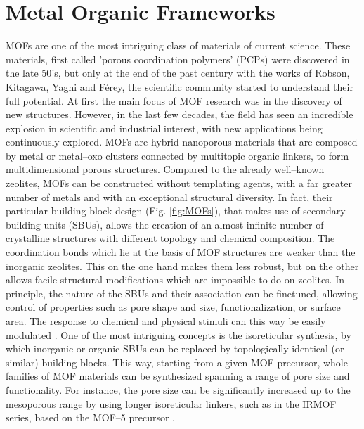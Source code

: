 \section{Metal Organic Frameworks}
MOFs are one of the most intriguing class of materials of current science. These materials, first called 'porous coordination polymers' (PCPs) were discovered in the late 50's, but only at the end of the past century with the works of Robson\cite{batten1995two,hoskins1990design}, Kitagawa\cite{kitagawa1991synthesis, kitagawa1993synthesis}, Yaghi\cite{yaghi1995hydrothermal} and F\'{e}rey\cite{riou1998hybrid}, the scientific community started to understand their full potential. At first the main focus of MOF research was in the discovery of new structures. However, in the last few decades, the field has seen an incredible explosion in scientific and industrial interest, with new applications being continuously explored\cite{furukawa2013chemistry}. MOFs are hybrid nanoporous materials that are composed by metal or metal--oxo clusters connected by multitopic organic linkers, to form multidimensional porous structures. Compared to the already well--known zeolites, MOFs can be constructed without templating agents, with a far greater number of metals and with an exceptional structural diversity. In fact, their particular building block design (Fig. \ref{fig:MOFs}), that makes use of secondary building units (SBUs), allows the creation of an almost infinite number of crystalline structures with different topology and chemical composition. 
\npar
The coordination bonds which lie at the basis of MOF structures are weaker than the inorganic zeolites. This on the one hand makes them less robust, but on the other allows facile structural modifications which are impossible to do on zeolites. In principle, the nature of the SBUs and their association can be finetuned\cite{stock2011synthesis}, allowing control of properties such as pore shape and size, functionalization, or surface area. The response to chemical and physical stimuli can this way be easily modulated \cite{zhou2014metal,zhou2012introduction}. 
One of the most intriguing concepts is the isoreticular synthesis, by which inorganic or organic SBUs can be replaced by topologically identical (or similar) building blocks. This way, starting from a given MOF precursor, whole families of MOF materials can be synthesized spanning a range of pore size and functionality. For instance, the pore size can be significantly increased up to the mesoporous range by using longer isoreticular linkers, such as in the IRMOF series, based on the MOF--5 precursor \cite{eddaoudi2002systematic}. 

